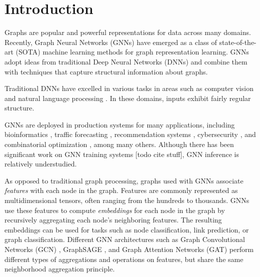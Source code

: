 \chapter{Introduction}


 
Graphs are popular and powerful representations for data across many domains.
Recently, Graph Neural Networks (GNNs) have emerged as a class of state-of-the-art (SOTA) machine learning methods for graph representation learning. 
GNNs adopt ideas from traditional Deep Neural Networks (DNNs) and combine them with techniques that capture structural information about graphs.

Traditional DNNs have excelled in various tasks in areas such as computer vision \cite{AlexNet_2012}\cite{YOLO_2016} and natural language processing \cite{RNN_2013}\cite{NamedEntityRecognition_2016}. In these domains, inputs exhibit fairly regular structure.

GNNs are deployed in production systems for many applications, including bioinformatics \cite{Bioinfo_2021} \cite{Bioinfo_2022}, 
traffic forecasting \cite{Traffic_SST-GNN_2021} \cite{Traffic_GoogleMaps_2021} \cite{Traffic_survey_2021}, recommendation systems \cite{Recsys_PinSAGE_2018} \cite{Recsys_Diffnet_2022}\cite{Recsys_LightGCN_2020}\cite{Recsys_NAGCN_2020}\cite{Recsys_SGL_2021}\cite{Recsys_Survey_2022}, 
cybersecurity \cite{Cybersec_2022} \cite{Cybersec_2023}, and combinatorial optimization \cite{CombinatorialOptimization_2019}\cite{CombinatorialOptimization_2021}, among many others. Although there has been significant work on GNN training systems [todo cite stuff], GNN inference is relatively understudied. 

As opposed to traditional graph processing, graphs used with GNNs associate \textit{features} with each node in the graph. 
Features are commonly represented as multidimensional tensors, often ranging from the hundreds to thousands. GNNs use these features to compute \textit{embeddings} for each node in the graph by recursively aggregating each node's neighboring features. 
The resulting embeddings can be used for tasks such as node classification, link prediction, or graph classification.
Different GNN architectures such as Graph Convolutional Networks (GCN) \cite{GCN_2016}, GraphSAGE \cite{GraphSAGE_2017}, and Graph Attention Networks (GAT) \cite{GAT_2018} perform different types of aggregations and operations on features, but share the same neighborhood aggregation principle.





